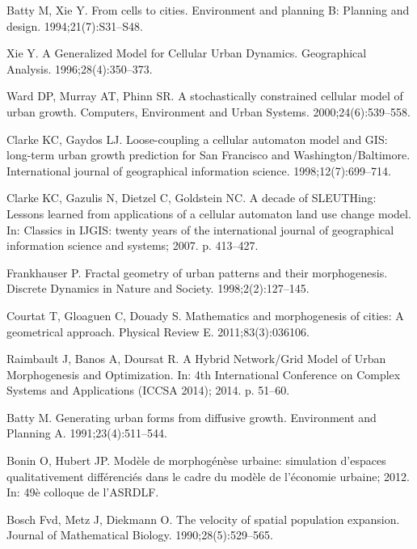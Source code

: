 \documentclass[10pt,letterpaper]{article}
\begin{document}
\begin{thebibliography}{10}
Batty M, Xie Y.
\newblock From cells to cities.
\newblock Environment and planning B: Planning and design. 1994;21(7):S31--S48.

Xie Y.
\newblock A Generalized Model for Cellular Urban Dynamics.
\newblock Geographical Analysis. 1996;28(4):350--373.

Ward DP, Murray AT, Phinn SR.
\newblock A stochastically constrained cellular model of urban growth.
\newblock Computers, Environment and Urban Systems. 2000;24(6):539--558.

Clarke KC, Gaydos LJ.
\newblock Loose-coupling a cellular automaton model and GIS: long-term urban
  growth prediction for San Francisco and Washington/Baltimore.
\newblock International journal of geographical information science.
  1998;12(7):699--714.

Clarke KC, Gazulis N, Dietzel C, Goldstein NC.
\newblock A decade of SLEUTHing: Lessons learned from applications of a
  cellular automaton land use change model.
\newblock In: Classics in IJGIS: twenty years of the international journal of
  geographical information science and systems; 2007. p. 413--427.

Frankhauser P.
\newblock Fractal geometry of urban patterns and their morphogenesis.
\newblock Discrete Dynamics in Nature and Society. 1998;2(2):127--145.

Courtat T, Gloaguen C, Douady S.
\newblock Mathematics and morphogenesis of cities: A geometrical approach.
\newblock Physical Review E. 2011;83(3):036106.

Raimbault J, Banos A, Doursat R.
\newblock A Hybrid Network/Grid Model of Urban Morphogenesis and Optimization.
\newblock In: 4th International Conference on Complex Systems and Applications
  (ICCSA 2014); 2014. p. 51--60.

Batty M.
\newblock Generating urban forms from diffusive growth.
\newblock Environment and Planning A. 1991;23(4):511--544.

Bonin O, Hubert JP.
\newblock Mod{\`e}le de morphog{\'e}n{\`e}se urbaine:
  simulation d'espaces qualitativement diff{\'e}renci{\'e}s dans le cadre du
  mod{\`e}le de l'{\'e}conomie urbaine; 2012.
\newblock In: 49{\`e} colloque de l'ASRDLF.

Bosch Fvd, Metz J, Diekmann O.
\newblock The velocity of spatial population expansion.
\newblock Journal of Mathematical Biology. 1990;28(5):529--565.


\end{thebibliography}
\end{document}
